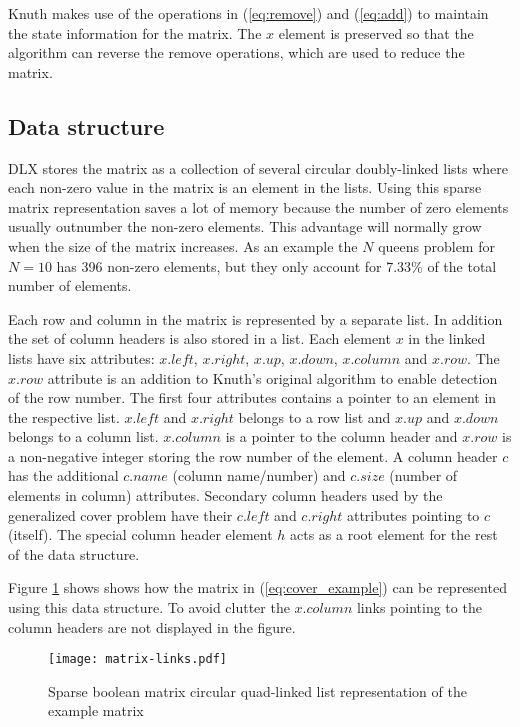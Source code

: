 Knuth makes use of the operations in (\ref{eq:remove}) and (\ref{eq:add}) to maintain the state information for the matrix.
The $x$ element is preserved so that the algorithm can reverse the remove operations, which are used to reduce the matrix.


\subsection{Data structure}
\label{dlx_struct}

DLX stores the matrix as a collection of several circular doubly-linked lists where each non-zero value in the matrix is an element in the lists.
Using this sparse matrix representation saves a lot of memory because the number of zero elements usually outnumber the non-zero elements.
This advantage will normally grow when the size of the matrix increases.
As an example the $N$ queens problem for $N=10$ has 396 non-zero elements, but they only account for 7.33\% of the total number of elements.

Each row and column in the matrix is represented by a separate list.
In addition the set of column headers is also stored in a list.
Each element $x$ in the linked lists have six attributes: $x.left$, $x.right$, $x.up$, $x.down$, $x.column$ and $x.row$.
The $x.row$ attribute is an addition to Knuth's original algorithm to enable detection of the row number.
The first four attributes contains a pointer to an element in the respective list.
$x.left$ and $x.right$ belongs to a row list and $x.up$ and $x.down$ belongs to a column list.
$x.column$ is a pointer to the column header and $x.row$ is a non-negative integer storing the row number of the element.
A column header $c$ has the additional $c.name$ (column name/number) and $c.size$ (number of elements in column) attributes.
Secondary column headers used by the generalized cover problem have their $c.left$ and $c.right$ attributes pointing to $c$ (itself).
The special column header element $h$ acts as a root element for the rest of the data structure.

Figure \ref{fig:matrix_links} shows shows how the matrix in (\ref{eq:cover_example}) can be represented using this data structure.
To avoid clutter the $x.column$ links pointing to the column headers are not displayed in the figure.
\begin{figure}[htbp]
	\centering
	\texttt{[image: matrix-links.pdf]}
	\caption{Sparse boolean matrix circular quad-linked list representation of the example matrix}
	\label{fig:matrix_links}
\end{figure}


